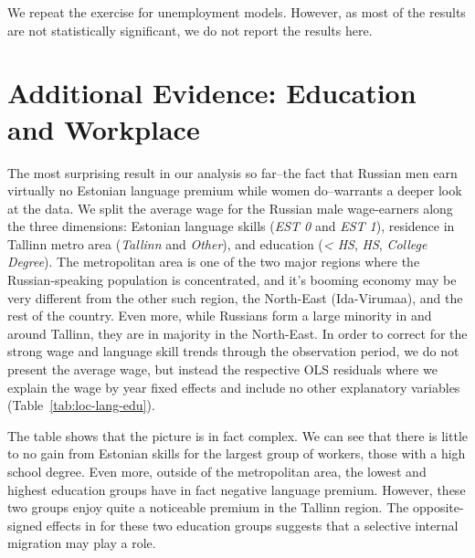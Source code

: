 \documentclass[12pt, a4paper]{article}
\begin{document}
We repeat the exercise for unemployment models.
However, as most of the results are not statistically significant, we
do not report the results here.



\section{Additional Evidence: Education and Workplace}
\label{sec:segregation_analysis}

The most surprising result in our analysis so far--the fact that
Russian men earn virtually no Estonian language premium while women do--warrants a
deeper look at the data.  We split the average wage for the Russian male wage-earners
along the three
dimensions: Estonian language skills (\emph{EST 0} and \emph{EST 1}),
residence in Tallinn metro area (\emph{Tallinn} and \emph{Other}),
and education (\emph{< HS}, \emph{HS}, \emph{College Degree}).  The metropolitan area is one of the two major regions
where the Russian-speaking population is concentrated, and it's
booming economy may be very different from the other such region, the
North-East (Ida-Virumaa), and the rest of the country.
Even more, while Russians form a large minority in and around Tallinn,
they are in majority in the North-East.  
In order to correct for the strong wage and language skill trends
through the observation period, we do not present the average wage,
but instead the respective OLS residuals where we explain the wage by year fixed
effects and include no other explanatory variables (Table~\ref{tab:loc-lang-edu}). 

The table shows that the picture is in fact complex.  We can see
that there is little to no gain from Estonian skills for the
largest group of workers, those with a high school degree.  Even more, outside of
the metropolitan area, the lowest and highest education groups
have in fact negative language premium.  However, these two groups
enjoy quite a noticeable premium in the Tallinn region.  The
opposite-signed effects in for these two education groups suggests
that a
selective internal migration may play a role.
\end{document}
